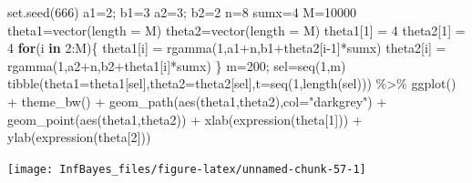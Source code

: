 \documentclass[
]{book}
\newenvironment{Shaded}{\begin{snugshade}}{\end{snugshade}}
\newcommand{\AttributeTok}[1]{\textcolor[rgb]{0.77,0.63,0.00}{#1}}
\newcommand{\ControlFlowTok}[1]{\textcolor[rgb]{0.13,0.29,0.53}{\textbf{#1}}}
\newcommand{\DecValTok}[1]{\textcolor[rgb]{0.00,0.00,0.81}{#1}}
\newcommand{\FunctionTok}[1]{\textcolor[rgb]{0.00,0.00,0.00}{#1}}
\newcommand{\NormalTok}[1]{#1}
\newcommand{\OtherTok}[1]{\textcolor[rgb]{0.56,0.35,0.01}{#1}}
\newcommand{\SpecialCharTok}[1]{\textcolor[rgb]{0.00,0.00,0.00}{#1}}
\newcommand{\StringTok}[1]{\textcolor[rgb]{0.31,0.60,0.02}{#1}}
\begin{document}
\begin{Shaded}
\begin{Highlighting}[]
\FunctionTok{set.seed}\NormalTok{(}\DecValTok{666}\NormalTok{)}
\NormalTok{a1}\OtherTok{=}\DecValTok{2}\NormalTok{; b1}\OtherTok{=}\DecValTok{3}
\NormalTok{a2}\OtherTok{=}\DecValTok{3}\NormalTok{; b2}\OtherTok{=}\DecValTok{2}
\NormalTok{n}\OtherTok{=}\DecValTok{8}
\NormalTok{sumx}\OtherTok{=}\DecValTok{4}
\NormalTok{M}\OtherTok{=}\DecValTok{10000}
\NormalTok{theta1}\OtherTok{=}\FunctionTok{vector}\NormalTok{(}\AttributeTok{length =}\NormalTok{ M)}
\NormalTok{theta2}\OtherTok{=}\FunctionTok{vector}\NormalTok{(}\AttributeTok{length =}\NormalTok{ M)}
\NormalTok{theta1[}\DecValTok{1}\NormalTok{] }\OtherTok{=} \DecValTok{4}
\NormalTok{theta2[}\DecValTok{1}\NormalTok{] }\OtherTok{=} \DecValTok{4}
\ControlFlowTok{for}\NormalTok{(i }\ControlFlowTok{in} \DecValTok{2}\SpecialCharTok{:}\NormalTok{M)\{}
\NormalTok{  theta1[i] }\OtherTok{=} \FunctionTok{rgamma}\NormalTok{(}\DecValTok{1}\NormalTok{,a1}\SpecialCharTok{+}\NormalTok{n,b1}\SpecialCharTok{+}\NormalTok{theta2[i}\DecValTok{{-}1}\NormalTok{]}\SpecialCharTok{*}\NormalTok{sumx)}
\NormalTok{  theta2[i] }\OtherTok{=} \FunctionTok{rgamma}\NormalTok{(}\DecValTok{1}\NormalTok{,a2}\SpecialCharTok{+}\NormalTok{n,b2}\SpecialCharTok{+}\NormalTok{theta1[i]}\SpecialCharTok{*}\NormalTok{sumx)}
\NormalTok{\}}
\NormalTok{m}\OtherTok{=}\DecValTok{200}\NormalTok{; sel}\OtherTok{=}\FunctionTok{seq}\NormalTok{(}\DecValTok{1}\NormalTok{,m)}
\FunctionTok{tibble}\NormalTok{(}\AttributeTok{theta1=}\NormalTok{theta1[sel],}\AttributeTok{theta2=}\NormalTok{theta2[sel],}\AttributeTok{t=}\FunctionTok{seq}\NormalTok{(}\DecValTok{1}\NormalTok{,}\FunctionTok{length}\NormalTok{(sel))) }\SpecialCharTok{\%\textgreater{}\%}
  \FunctionTok{ggplot}\NormalTok{() }\SpecialCharTok{+} \FunctionTok{theme\_bw}\NormalTok{() }\SpecialCharTok{+}
  \FunctionTok{geom\_path}\NormalTok{(}\FunctionTok{aes}\NormalTok{(theta1,theta2),}\AttributeTok{col=}\StringTok{"darkgrey"}\NormalTok{) }\SpecialCharTok{+}
  \FunctionTok{geom\_point}\NormalTok{(}\FunctionTok{aes}\NormalTok{(theta1,theta2)) }\SpecialCharTok{+}
  \FunctionTok{xlab}\NormalTok{(}\FunctionTok{expression}\NormalTok{(theta[}\DecValTok{1}\NormalTok{])) }\SpecialCharTok{+} \FunctionTok{ylab}\NormalTok{(}\FunctionTok{expression}\NormalTok{(theta[}\DecValTok{2}\NormalTok{]))}
\end{Highlighting}
\end{Shaded}

\begin{center}\texttt{[image: InfBayes\_files/figure-latex/unnamed-chunk-57-1]} \end{center}
\end{document}
